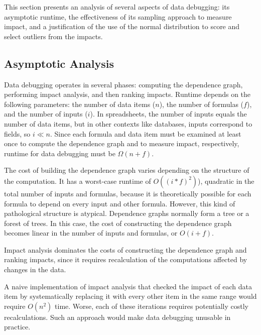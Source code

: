 
This section presents an analysis of several aspects of data
debugging: its asymptotic runtime, the effectiveness of its sampling
approach to measure impact, and a justification of the use of the
normal distribution to score and select outliers from the impacts.

\subsection{Asymptotic Analysis}

Data debugging operates in several phases: computing the dependence
graph, performing impact analysis, and then ranking impacts. Runtime
depends on the following parameters: the number of data items ($n$),
the number of formulas ($f$), and the number of inputs ($i$). In
spreadsheets, the number of inputs equals the number of data items,
but in other contexts like databases, inputs correspond to fields, so
$i \ll n$. Since each formula and data item must be examined at least
once to compute the dependence graph and to measure impact,
respectively, runtime for data debugging must be 
$\Omega(n+f)$.

The cost of building the dependence graph varies depending on the
structure of the computation. It has a worst-case runtime of
$O((i*f)^2)$), quadratic in the total number of inputs and formulas,
because it is theoretically possible for each formula to depend on
every input and other formula. However, this kind of pathological
structure is atypical. Dependence graphs normally form a tree or a
forest of trees. In this case, the cost of constructing the dependence
graph becomes linear in the number of inputs and formulas, or
$O(i+f)$.

Impact analysis dominates the costs of constructing the dependence
graph and ranking impacts, since it requires recalculation of the
computations affected by changes in the data.

A naive implementation of impact analysis that checked the impact of
each data item by systematically replacing it with every other item in
the same range would require $O(n^2)$ time. Worse, each of these
iterations requires potentially costly recalculations. Such an
approach would make data debugging unusable in practice.
 
